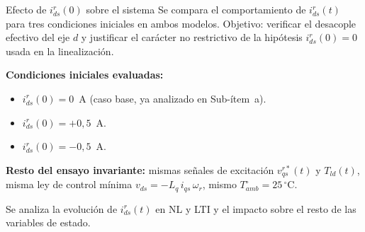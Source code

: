 \documentclass[aspectratio=169,t]{beamer}
\begin{document}
\begin{frame}{Efecto de $i_{ds}^{r}(0)$ sobre el sistema}
{\small\color{uncGray}Se compara el comportamiento de $i_{ds}^{r}(t)$ para tres condiciones iniciales en ambos modelos. Objetivo: verificar el desacople efectivo del eje $d$ y justificar el carácter no restrictivo de la hipótesis $i_{ds}^{r}(0)=0$ usada en la linealización.}\par
\vspace{4mm}

\textbf{Condiciones iniciales evaluadas:}
\begin{itemize}
\item $i_{ds}^{r}(0) = 0$~A (caso base, ya analizado en Sub-ítem~a).
\item $i_{ds}^{r}(0) = +0{,}5$~A.
\item $i_{ds}^{r}(0) = -0{,}5$~A.
\end{itemize}

\vspace{2mm}
\textbf{Resto del ensayo invariante:} mismas señales de excitación $v_{qs}^{r*}(t)$ y $T_{ld}(t)$, misma ley de control mínima $v_{ds} = -L_q\,i_{qs}\,\omega_r$, mismo $T_{amb}^\circ=25\,^\circ$C.

Se analiza la evolución de $i_{ds}^{r}(t)$ en NL y LTI y el impacto sobre el resto de las variables de estado.
\end{frame}
\end{document}
